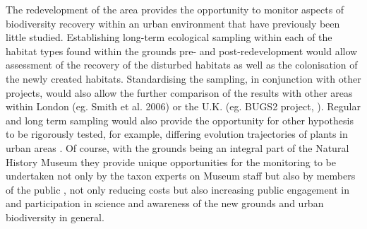 The redevelopment of the area provides the opportunity to monitor aspects of biodiversity recovery within an urban environment that have previously been little studied. Establishing long-term ecological sampling within each of the habitat types found within the grounds pre- and post-redevelopment would allow assessment of the recovery of the disturbed habitats as well as the colonisation of the newly created habitats.  Standardising the sampling, in conjunction with other projects, would also allow the further comparison of the results with other areas within London (eg. Smith et al. 2006) or the U.K. (eg. BUGS2 project, \citealt{Loram:2007le}).  Regular and long term sampling would also provide the opportunity for other hypothesis to be rigorously tested, for example, differing evolution trajectories of plants in urban areas \citep{Johnson:2015ajb}.  Of course, with the grounds being an integral part of the Natural History Museum they provide unique opportunities for the monitoring to be undertaken not only by the taxon experts on Museum staff but also by members of the public \citep{Silvertown:2009tree,Roy:2012citsci}, not only reducing costs but also increasing public engagement in and participation in science and awareness of the new grounds and urban biodiversity in general. 


